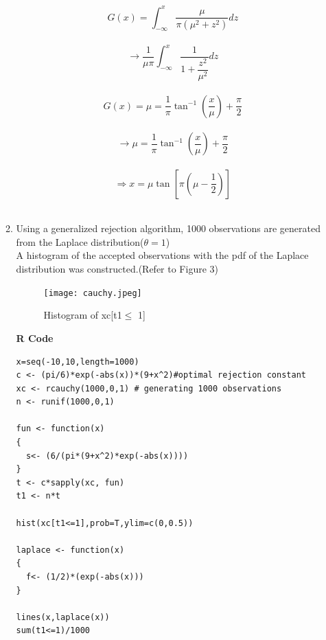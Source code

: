 \documentclass[letterpaper]{article}
\begin{document}
\begin{enumerate}
\begin{enumerate}
\begin{equation*}
 G(x) = \int_{-\infty}^{x} \dfrac{\mu}{\pi(\mu^2+ z^2)} dz
\end{equation*}\\

\begin{equation*}
\rightarrow \dfrac{1}{\mu \pi}\int_{-\infty}^{x}\dfrac{1}{1+\dfrac{z^2}{\mu^2}} dz
\end{equation*}\\

\begin{equation*}
 G(x) = \mu = \dfrac{1}{\pi} \tan ^{-1}(\dfrac{x}{\mu})+\dfrac{\pi}{2}
\end{equation*}\\

\begin{equation*}
\rightarrow \mu = \dfrac{1}{\pi} \tan^{-1}(\dfrac{x}{\mu}) + \dfrac{\pi}{2}
\end{equation*}\\

\begin{equation*}
\Rightarrow x= \mu \tan[\pi(\mu-\dfrac{1}{2})]
\end{equation*}\\



\item Using a generalized rejection algorithm, 1000 observations are generated from the Laplace distribution($\theta = 1$)\\
A histogram of the accepted observations with the pdf of the Laplace distribution was constructed.(Refer to Figure 3)
\begin{figure}[h]
    \centering
     \texttt{[image: cauchy.jpeg]}
      \caption{ Histogram of xc[t1$\leq$ 1] }
        \label{Figure 3}
\end{figure}


\textbf {R Code}\\
\begin{verbatim}
x=seq(-10,10,length=1000)
c <- (pi/6)*exp(-abs(x))*(9+x^2)#optimal rejection constant
xc <- rcauchy(1000,0,1) # generating 1000 observations
n <- runif(1000,0,1)

fun <- function(x)
{
  s<- (6/(pi*(9+x^2)*exp(-abs(x))))
}
t <- c*sapply(xc, fun)
t1 <- n*t

hist(xc[t1<=1],prob=T,ylim=c(0,0.5))

laplace <- function(x)
{
  f<- (1/2)*(exp(-abs(x)))
}

lines(x,laplace(x))
sum(t1<=1)/1000
\end{verbatim}
 

\end{enumerate}
\end{enumerate}
\end{document}
